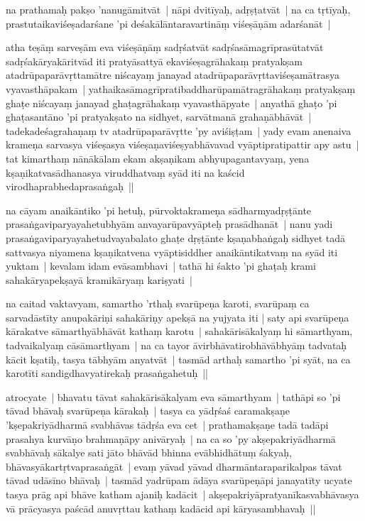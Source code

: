 \documentclass[article,12pt,a4paper]{memoir}
\begin{document}
	  \pstart na prathamaḥ pakṣo 'nanugāmitvāt | nāpi dvitīyaḥ, adṛṣṭatvāt | na ca tṛtīyaḥ, prastutaikaviśeṣadarśane 'pi deśakālāntaravartināṃ viśeṣāṇām adarśanāt |
	\pend
      

	  \pstart atha teṣāṃ sarveṣām eva viśeṣāṇāṃ sadṛśatvāt sadṛśasāmagrīprasūtatvāt sadṛśakāryakāritvād iti pratyāsattyā ekaviśeṣagrāhakaṃ pratyakṣam atadrūpaparāvṛttamātre niścayaṃ janayad atadrūpaparāvṛttaviśeṣamātrasya vyavasthāpakam | \label{thakur75-74.9} yathaikasāmagrīpratibaddharūpamātragrāhakaṃ pratyakṣaṃ ghaṭe niścayaṃ janayad ghaṭagrāhakaṃ vyavasthāpyate | anyathā ghaṭo 'pi ghaṭasantāno 'pi pratyakṣato na sidhyet, sarvātmanā grahaṇābhāvāt | \label{thakur75-74.12} tadekadeśagrahaṇaṃ tv atadrūpaparāvṛtte 'py aviśiṣṭam | yady evam anenaiva krameṇa sarvasya viśeṣasya viśeṣaṇaviśeṣyabhāvavad vyāptipratipattir apy astu | \label{thakur75-74.13} tat kimarthaṃ nānākālam ekam akṣaṇikam abhyupagantavyaṃ, yena kṣaṇikatvasādhanasya viruddhatvaṃ syād iti na kaścid virodhaprabhedaprasaṅgaḥ ||
	\pend
      

	  \pstart na cāyam anaikāntiko 'pi hetuḥ, pūrvoktakrameṇa sādharmyadṛṣṭānte prasaṅgaviparyayahetubhyām anvayarūpavyāpteḥ prasādhanāt | \label{thakur75-74.17} nanu yadi prasaṅgaviparyayahetudvayabalato ghaṭe dṛṣṭānte kṣaṇabhaṅgaḥ sidhyet tadā sattvasya niyamena kṣaṇikatvena vyāptisiddher anaikāntikatvaṃ na syād iti yuktam | kevalam idam evāsambhavi | tathā hi śakto 'pi ghaṭaḥ krami sahakāryapekṣayā kramikāryaṃ kariṣyati |
	\pend
      

	  \pstart na caitad vaktavyam, samartho 'rthaḥ svarūpeṇa karoti, svarūpaṃ ca sarvadāstīty anupakāriṇi sahakāriṇy apekṣā na yujyata iti | saty api svarūpeṇa kārakatve sāmarthyābhāvāt kathaṃ karotu | sahakārisākalyaṃ hi sāmarthyam, tadvaikalyaṃ cāsāmarthyam | na ca tayor āvirbhāvatirobhāvābhyāṃ tadvataḥ kācit kṣatiḥ, tasya tābhyām anyatvāt | tasmād arthaḥ samartho 'pi syāt, na ca karotīti sandigdhavyatirekaḥ prasaṅgahetuḥ ||
	\pend
      

	  \pstart atrocyate | bhavatu tāvat sahakārisākalyam eva sāmarthyam | tathāpi so 'pi tāvad bhāvaḥ svarūpeṇa kārakaḥ | \label{thakur75-74.28} tasya ca yādṛśaś caramakṣaṇe 'kṣepakriyādharmā svabhāvas tādṛśa eva cet | \label{thakur75-74.29} prathamakṣaṇe tadā tadāpi prasahya kurvāṇo brahmaṇāpy anivāryaḥ | na ca so 'py akṣepakriyādharmā svabhāvaḥ sākalye sati jāto bhāvād bhinna evābhidhātuṃ śakyaḥ, bhāvasyākartṛtvaprasaṅgāt | evaṃ yāvad yāvad dharmāntaraparikalpas tāvat tāvad udāsīno bhāvaḥ | \label{thakur75-75.2} tasmād yadrūpam ādāya svarūpeṇāpi janayatīty ucyate tasya prāg api bhāve katham ajaniḥ kadācit | akṣepakriyāpratyanīkasvabhāvasya vā prācyasya paścād anuvṛttau kathaṃ kadācid api kāryasambhavaḥ ||
	\pend
      
\end{document}
